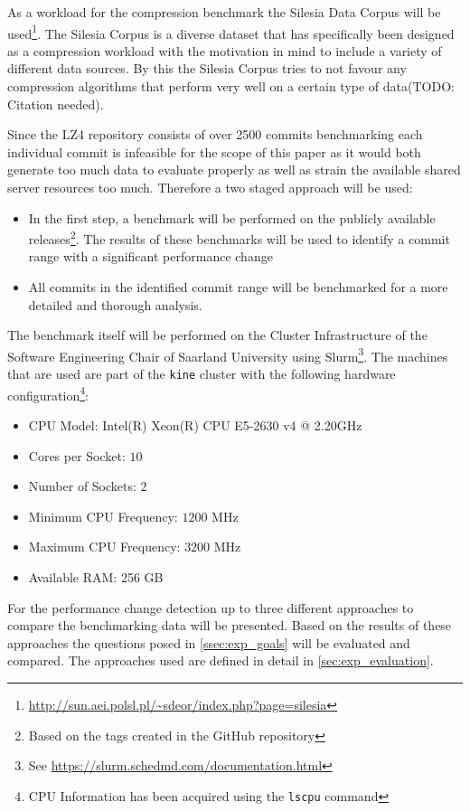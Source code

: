 \documentclass[	runningheads,
				a4paper]{llncs}
\begin{document}
	As a workload for the compression benchmark the Silesia Data Corpus will be used\footnote{\url{http://sun.aei.polsl.pl/~sdeor/index.php?page=silesia}}. The Silesia Corpus is a diverse dataset that has specifically been designed as a compression workload with the motivation in mind to include a variety of different data sources. By this the Silesia Corpus tries to not favour any compression algorithms that perform very well on a certain type of data(TODO: Citation needed).

Since the LZ4 repository consists of over 2500 commits benchmarking each individual commit is infeasible for the scope of this paper as it would both generate too much data to evaluate properly as well as strain the available shared server resources too much. Therefore a two staged approach will be used:
\begin{itemize}
	\item In the first step, a benchmark will be performed on the publicly available releases\footnote{Based on the tags created in the GitHub repository}. The results of these benchmarks will be used to identify a commit range with a significant performance change
	\item All commits in the identified commit range will be benchmarked for a more detailed and thorough analysis.
\end{itemize}

The benchmark itself will be performed on the Cluster Infrastructure of the Software Engineering Chair of Saarland University using Slurm\footnote{See \url{https://slurm.schedmd.com/documentation.html}}. The machines that are used are part of the \texttt{kine} cluster with the following hardware configuration\footnote{CPU Information has been acquired using the \texttt{lscpu} command}:

\begin{itemize}
	\item CPU Model: Intel(R) Xeon(R) CPU E5-2630 v4 @ 2.20GHz
	\item Cores per Socket: $10$
	\item Number of Sockets: $2$
	\item Minimum CPU Frequency: $1200$ MHz
	\item Maximum CPU Frequency: $3200$ MHz
	\item Available RAM: 256 GB
\end{itemize}

For the performance change detection up to three different approaches to compare the benchmarking data will be presented. Based on the results of these approaches the questions posed in \autoref{ssec:exp_goals} will be evaluated and compared. The approaches used are defined in detail in \autoref{sec:exp_evaluation}.
\end{document}
